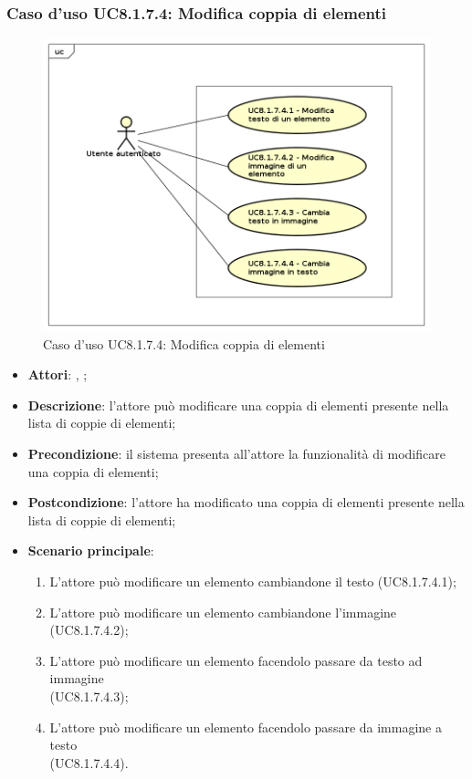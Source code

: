 	\subsubsection{Caso d'uso UC8.1.7.4: Modifica coppia di elementi}
	\label{UC8.1.7.4}
	\begin{figure}[h]
		\centering
		\includegraphics[scale=0.5,keepaspectratio]{UML/UC8_1_7_4.png}
		\caption{Caso d'uso UC8.1.7.4: Modifica coppia di elementi}
	\end{figure}
	\FloatBarrier
	\begin{itemize}
		\item \textbf{Attori}: \uau, \uaupro;
		\item \textbf{Descrizione}: l'attore può modificare una coppia di elementi presente nella lista di coppie di elementi;
		\item \textbf{Precondizione}: il sistema presenta all'attore la funzionalità di modificare una coppia di elementi;
		\item \textbf{Postcondizione}: l'attore ha modificato una coppia di elementi presente nella lista di coppie di elementi; 
		\item \textbf{Scenario principale}: 
		\begin{enumerate}
			\item L'attore può modificare un elemento cambiandone il testo (UC8.1.7.4.1);
			\item L'attore può modificare un elemento cambiandone l'immagine (UC8.1.7.4.2);
			\item L'attore può modificare un elemento facendolo passare da testo ad immagine \\(UC8.1.7.4.3);
			\item L'attore può modificare un elemento facendolo passare da immagine a testo \\(UC8.1.7.4.4).	
		\end{enumerate}
	\end{itemize}
	
